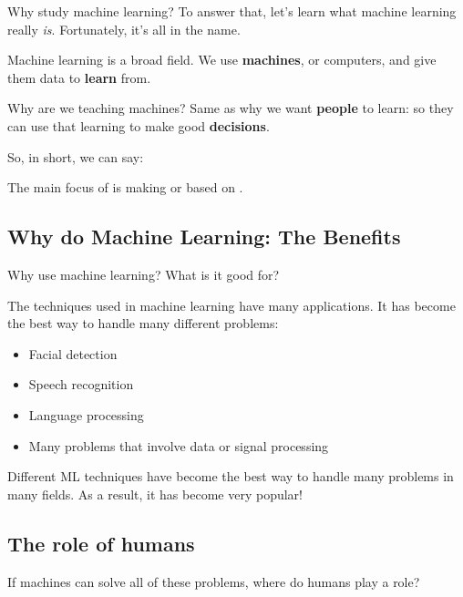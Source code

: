         Why study machine learning? To answer that, let's learn what machine learning really \textit{is}. Fortunately, it's all in the name.
        
        Machine learning is a broad field. We use \textbf{machines}, or computers, and give them data to \textbf{learn} from. 
        
        Why are we teaching machines? Same as why we want \textbf{people} to learn: so they can use that learning to make good \textbf{decisions}.
        
        So, in short, we can say: \\
        
        \begin{concept}
            The main focus of  is making  or  based on .
        \end{concept}
        
        
    \subsection{Why do Machine Learning: The Benefits} %
        
        Why use machine learning? What is it good for?
        
        The techniques used in machine learning have many applications. It has become the best way to handle many different problems:
        
        \begin{itemize}
            \item Facial detection
            \item Speech recognition
            \item Language processing
            \item Many problems that involve data or signal processing
        \end{itemize}
        
        Different ML techniques have become the best way to handle many problems in many fields. As a result, it has become very popular!

    
    \subsection{The role of humans} %
        
        If machines can solve all of these problems, where do humans play a role?
        
